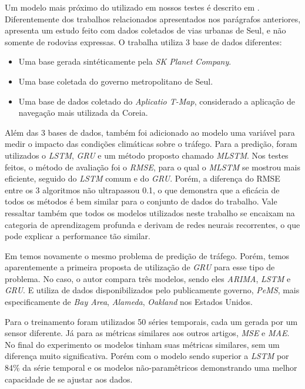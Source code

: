 Um modelo mais próximo do utilizado em nossos testes é descrito em \cite{Seoul}. Diferentemente dos trabalhos relacionados apresentados nos parágrafos anteriores, \cite{Seoul} apresenta um estudo feito com dados coletados de vias urbanas de Seul, e não somente de rodovias expressas. O trabalha utiliza 3 base de dados diferentes:

\begin{itemize}
    \item Uma base gerada sintéticamente pela \textit{SK Planet Company}.
    \item Uma base coletada do governo metropolitano de Seul.
    \item Uma base de dados coletado do \textit{Aplicatio T-Map}, considerado a aplicação de navegação mais utilizada da Coreia.
\end{itemize} 

Além das 3 bases de dados, também foi adicionado ao modelo uma variável para medir o impacto das condições climáticas sobre o tráfego.
Para a predição, foram utilizados o \textit{\acrshort{LSTM}}, \textit{\acrshort{GRU}} e um método proposto chamado \textit{\acrfull{MLSTM}}. Nos testes feitos, o método de avaliação foi o \textit{\acrshort{RMSE}}, para o qual o \textit{\acrshort{MLSTM}} se mostrou mais eficiente, seguido do \textit{\acrshort{LSTM}} comum e do \textit{\acrshort{GRU}}. Porém, a diferença do RMSE entre os 3 algoritmos não ultrapassou 0.1, o que demonstra que a eficácia de todos os métodos é bem similar para o conjunto de dados do trabalho. Vale ressaltar também que todos os modelos utilizados neste trabalho se encaixam na categoria de aprendizagem profunda e derivam de redes neurais recorrentes, o que pode explicar a performance tão similar.

Em \cite{fu2016using} temos novamente o mesmo problema de predição de tráfego. Porém, temos aparentemente a primeira proposta de utilização de \textit{\acrfull{GRU}} para esse tipo de problema. No caso, o autor compara três modelos, sendo eles \textit{\acrshort{ARIMA}}, \textit{\acrshort{LSTM}} e \textit{\acrshort{GRU}}. E utiliza de dados disponibilizados pelo publicamente governo, \textit{PeMS}, mais especificamente de \textit{Bay Area}, \textit{Alameda}, \textit{Oakland} nos Estados Unidos. 

Para o treinamento foram utilizados 50 séries temporais, cada um gerada por um sensor diferente. Já para as métricas similares aos outros artigos, \textit{\acrshort{MSE}} e \textit{\acrshort{MAE}}. No final do experimento os modelos tinham suas métricas similares, sem um diferença muito significativa. Porém com o modelo  sendo superior a \textit{\acrshort{LSTM}} por 84\% da série temporal e os modelos não-paramêtricos demonstrando uma melhor capacidade de se ajustar aos dados.